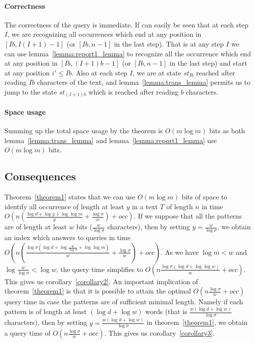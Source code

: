 \documentclass{article}
\newcommand{\?}{\mskip1.5mu}
\begin{document}
\paragraph{Correctness}
The correctness of the query is immediate. If can easily be seen that at each step $I$, we are recognizing all occurrences which end at any position in $[Ib,I(I+1)-1]$ (or $[Ib,n-1]$ in the last step). That is at any step $I$ we can use lemma~\ref{lemma:report1_lemma} to recognize all the occurrence which end at any position in $[Ib,(I+1)b-1]$ (or $[Ib,n-1]$ in the last step) and start at any position $i'\leq Ib$. Also at each step $I$, we are at state $st_{Ib}$ reached after reading $Ib$ characters of the text, and lemma~\ref{lemma:trans_lemma} permits us to jump to the state $st_{(I+1)b}$ which is reached after reading $b$ characters.
\paragraph{Space usage}
Summing up the total space usage by the theorem is $O(m\log m)$ bits as both lemma~\ref{lemma:trans_lemma} and lemma~\ref{lemma:report1_lemma} use $O(m\log m)$ bits. 


\subsection{Consequences}
Theorem~\ref{theorem1} states that we can use $O(m\log m)$ bits of space to identify all occurrence of length at least $y$ in a text $T$ of length $n$ in time $O(n(\frac{\log d+\log y+\log\log m}{y}+\frac{\log\sigma}{w})+occ)$. If we suppose that all the patterns are of length at least $w$ bits ($\frac{w}{\log\sigma}$ characters), then by setting $y=\frac{w}{\log\sigma}$, we obtain an index which answers to queries in time $O(n(\frac{\log\sigma(\log d+\log\frac{w}{\log\sigma}+\log\log m)}{w}+\frac{\log\sigma}{w})+occ)$. As we have $\log m<w$ and $\log\frac{w}{\log\sigma}<\log w$, the query time simplifies to  $O(n\frac{\log\sigma(\log d+\log\log w)}{w}+occ)$. This gives us corollary~\ref{corollary2}. 
An important implication of theorem~\ref{theorem1} is that it is possible to attain the optimal $O(n\frac{\log \sigma}{w}+occ)$ query time in case the patterns are of sufficient minimal length. Namely if each pattern is of length at least $(\log d+\log w)$ words (that is $\frac{w(\log d+\log w)}{\log\sigma}$ characters), then by setting $y=\frac{w(\log d+\log w)}{\log\sigma}$ in theorem~\ref{theorem1}, we obtain a query time of $O(n\frac{\log \sigma}{w}+occ)$.  This gives us corollary~\ref{corollary3}.  
\end{document}

